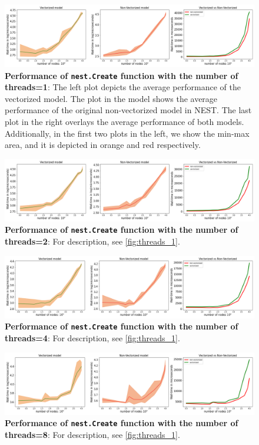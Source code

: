\begin{figure}[t!]
    \centering
    \includegraphics[width=\textwidth]{src/pic/thread_1.png}
    \caption{\textbf{Performance of \texttt{nest.Create} function with the number of threads=1}: The left plot depicts the average performance of the vectorized model. The plot in the model shows the average performance of the original non-vectorized model in NEST. The last plot in the right overlays the average performance of both models. Additionally, in the first two plots in the left, we show the min-max area, and it is depicted in orange and red respectively.}
    \label{fig:threads_1}
\end{figure}
\begin{figure}[t!]
    \centering
    \includegraphics[width=\textwidth]{src/pic/thread_2.png}
    \caption{\textbf{Performance of \texttt{nest.Create} function with the number of threads=2}: For description, see \autoref{fig:threads_1}.}
    \label{fig:threads_2}
\end{figure}

\begin{figure}[t!]
    \centering
    \includegraphics[width=\textwidth]{src/pic/thread_4.png}
    \caption{\textbf{Performance of \texttt{nest.Create} function with the number of threads=4}: For description, see \autoref{fig:threads_1}.}
    \label{fig:threads_4}
\end{figure}

\begin{figure}[t!]
    \centering
    \includegraphics[width=\textwidth]{src/pic/thread_8.png}
    \caption{\textbf{Performance of \texttt{nest.Create} function with the number of threads=8}: For description, see \autoref{fig:threads_1}.}
    \label{fig:threads_8}
\end{figure}


